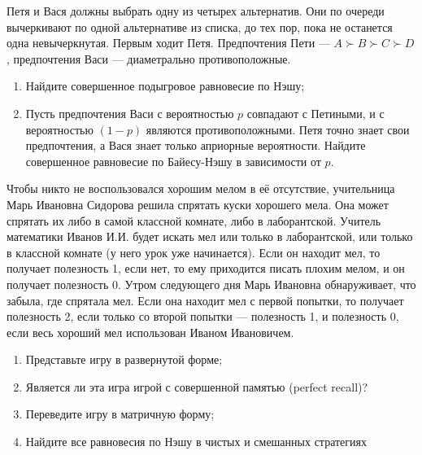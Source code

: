 \begin{problem}[Вето]
Петя и Вася должны выбрать одну из четырех альтернатив. Они по очереди вычеркивают по одной альтернативе из списка, до тех пор, пока не останется одна невычеркнутая. Первым ходит Петя. Предпочтения Пети ---  $A\succ B\succ C\succ D$, предпочтения Васи --- диаметрально противоположные.\par
\begin{enumerate}
\item Найдите совершенное подыгровое равновесие по Нэшу;\par
\item Пусть предпочтения Васи с вероятностью  $p$  совпадают с Петиными, и с вероятностью  $\left(1-p\right)$  являются противоположными. Петя точно знает свои предпочтения, а Вася знает только априорные вероятности. Найдите совершенное равновесие по Байесу-Нэшу в зависимости от  $p$.\par
\end{enumerate}



\begin{sol}

\end{sol}
\end{problem}



\begin{problem}
Чтобы никто не воспользовался хорошим мелом в её отсутствие, учительница Марь Ивановна Сидорова решила спрятать куски хорошего мела. Она может спрятать их либо в самой классной комнате, либо в лаборантской. Учитель математики Иванов И.И. будет искать мел или только в лаборантской, или только в классной комнате (у него урок уже начинается). Если он находит мел, то получает полезность 1, если нет, то ему приходится писать плохим мелом, и он получает полезность 0. Утром следующего дня Марь Ивановна обнаруживает, что забыла, где спрятала мел. Если она находит мел с первой попытки, то получает полезность 2, если только со второй попытки --- полезность 1, и полезность 0, если весь хороший мел использован Иваном Ивановичем.\par
\begin{enumerate}
\item Представьте игру в развернутой форме;\par
\item Является ли эта игра игрой с совершенной памятью (perfect recall)?\par
\item  Переведите игру в матричную форму;\par
\item Найдите все равновесия по Нэшу в чистых и смешанных стратегиях\par
\end{enumerate}


\begin{sol}

\end{sol}
\end{problem}



